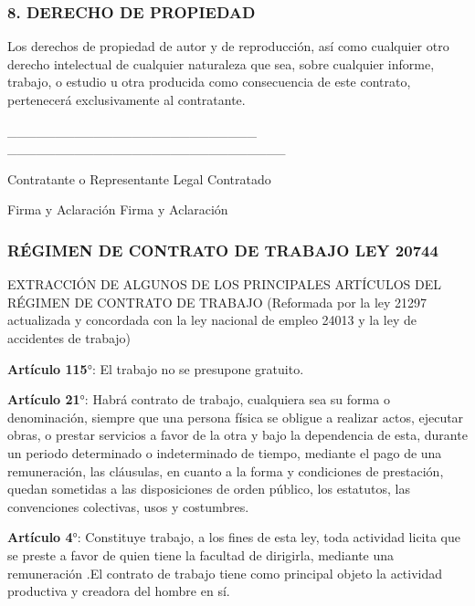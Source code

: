 
\subsubsection*{8. DERECHO DE PROPIEDAD}
Los derechos de propiedad de autor y de reproducción, así como cualquier otro derecho intelectual de cualquier naturaleza que sea, sobre cualquier informe, trabajo, o estudio u otra producida como consecuencia de este contrato, pertenecerá exclusivamente al contratante.

\_\_\_\_\_\_\_\_\_\_\_\_\_\_\_\_\_\_\_\_\_\_\_\_\_\_                                    \_\_\_\_\_\_\_\_\_\_\_\_\_\_\_\_\_\_\_\_\_\_\_\_\_\_\_\_\_

Contratante o Representante Legal                                                                                                                       Contratado

Firma y Aclaración                                                                                                                              Firma y Aclaración

\subsubsection*{RÉGIMEN DE CONTRATO DE TRABAJO LEY 20744}
EXTRACCIÓN DE ALGUNOS DE LOS PRINCIPALES ARTÍCULOS DEL RÉGIMEN DE CONTRATO DE TRABAJO (Reformada por la ley 21297 actualizada y concordada con la ley nacional de empleo 24013 y la ley de accidentes de trabajo)

\textbf{Artículo 115}°: El trabajo no se presupone gratuito.

\textbf{Artículo 21}°: Habrá contrato de trabajo, cualquiera sea su forma o denominación, siempre que una persona física se obligue a realizar actos, ejecutar obras, o prestar servicios a favor de la otra y bajo la dependencia de esta, durante un periodo determinado o indeterminado de tiempo, mediante el pago de una remuneración, las cláusulas, en cuanto a la forma y condiciones de prestación, quedan sometidas a las disposiciones de orden público, los estatutos, las convenciones colectivas, usos y costumbres.

\textbf{Artículo 4}°: Constituye trabajo, a los fines de esta ley, toda actividad licita que se preste a favor de quien tiene la facultad de dirigirla, mediante una remuneración .El contrato de trabajo tiene como principal objeto la actividad productiva y creadora del hombre en sí.

